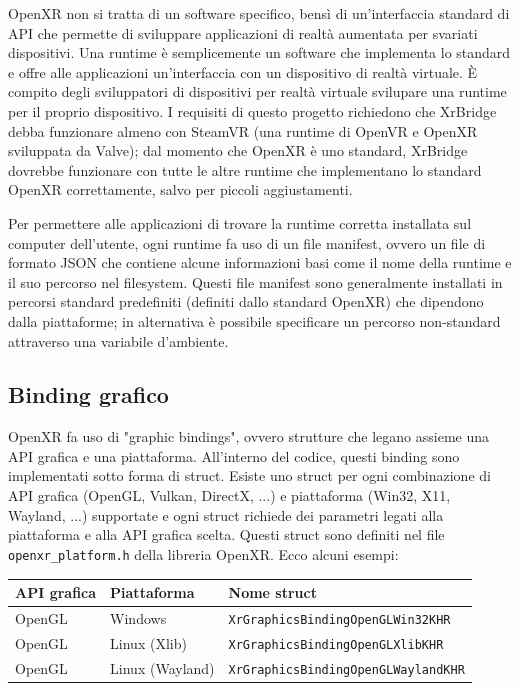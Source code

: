 \documentclass[twoside]{supsistudent}
\begin{document}
OpenXR non si tratta di un software specifico, bensì di un'interfaccia standard di API che permette di sviluppare applicazioni di realtà aumentata per svariati dispositivi. Una runtime è semplicemente un software che implementa lo standard e offre alle applicazioni un'interfaccia con un dispositivo di realtà virtuale. È compito degli sviluppatori di dispositivi per realtà virtuale svilupare una runtime per il proprio dispositivo. I requisiti di questo progetto richiedono che XrBridge debba funzionare almeno con SteamVR (una runtime di OpenVR e OpenXR sviluppata da Valve); dal momento che OpenXR è uno standard, XrBridge dovrebbe funzionare con tutte le altre runtime che implementano lo standard OpenXR correttamente, salvo per piccoli aggiustamenti.

Per permettere alle applicazioni di trovare la runtime corretta installata sul computer dell'utente, ogni runtime fa uso di un file manifest, ovvero un file di formato JSON che contiene alcune informazioni basi come il nome della runtime e il suo percorso nel filesystem. Questi file manifest sono generalmente installati in percorsi standard predefiniti (definiti dallo standard OpenXR) che dipendono dalla piattaforme; in alternativa è possibile specificare un percorso non-standard attraverso una variabile d'ambiente.


\subsection{Binding grafico}

OpenXR fa uso di "graphic bindings", ovvero strutture che legano assieme una API grafica e una piattaforma. All'interno del codice, questi binding sono implementati sotto forma di struct. Esiste uno struct per ogni combinazione di API grafica (OpenGL, Vulkan, DirectX, ...) e piattaforma (Win32, X11, Wayland, ...) supportate e ogni struct richiede dei parametri legati alla piattaforma e alla API grafica scelta. Questi struct sono definiti nel file \texttt{openxr\_platform.h} della libreria OpenXR. Ecco alcuni esempi:

\begin{center}
  \begin{tabular}{ l l l }
    API grafica & Piattaforma & Nome struct \\
    \hline
    OpenGL      & Windows         & \texttt{XrGraphicsBindingOpenGLWin32KHR} \\
    OpenGL      & Linux (Xlib)    & \texttt{XrGraphicsBindingOpenGLXlibKHR} \\
    OpenGL      & Linux (Wayland) & \texttt{XrGraphicsBindingOpenGLWaylandKHR}
  \end{tabular}
\end{center}
\end{document}
